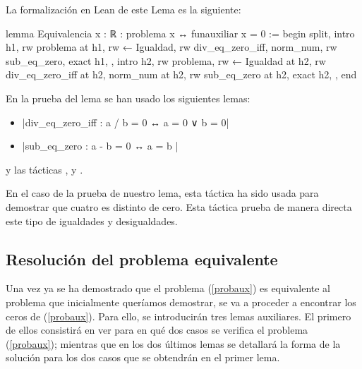La formalización en Lean de este Lema es la siguiente:
\begin{leancode}
lemma Equivalencia
  {x : ℝ}
  : problema x ↔ funauxiliar x = 0 :=
begin
  split,
  { intro h1,
    rw problema at h1,
    rw ← Igualdad,
    rw div_eq_zero_iff,
    norm_num,
    rw sub_eq_zero,
    exact h1, },
  { intro h2,
    rw problema,
    rw ← Igualdad at h2,
    rw div_eq_zero_iff at h2,
    norm_num at h2,
    rw sub_eq_zero at h2,
    exact h2, },
end
\end{leancode}

En la prueba del lema se han usado los siguientes lemas:
\begin{itemize}
\item {}|div_eq_zero_iff : a / b = 0 ↔ a = 0 ∨ b = 0|
\item {}|sub_eq_zero : a - b = 0 ↔ a = b |
\end{itemize}
y las tácticas
,
 y
.

En el caso de la prueba de nuestro lema, esta táctica ha sido usada para
demostrar que cuatro es distinto de cero. Esta táctica prueba de manera
directa este tipo de igualdades y desigualdades.

\subsection{Resolución del problema equivalente}\label{secequiv}

Una vez ya se ha demostrado que el problema (\ref{probaux}) es
equivalente al problema que inicialmente queríamos demostrar, se va a
proceder a encontrar los ceros de (\ref{probaux}). Para ello, se
introducirán tres lemas auxiliares. El primero de ellos consistirá en
ver para en qué dos casos se verifica el problema (\ref{probaux});
mientras que en los dos últimos lemas se detallará la forma de la
solución para los dos casos que se obtendrán en el primer lema.

